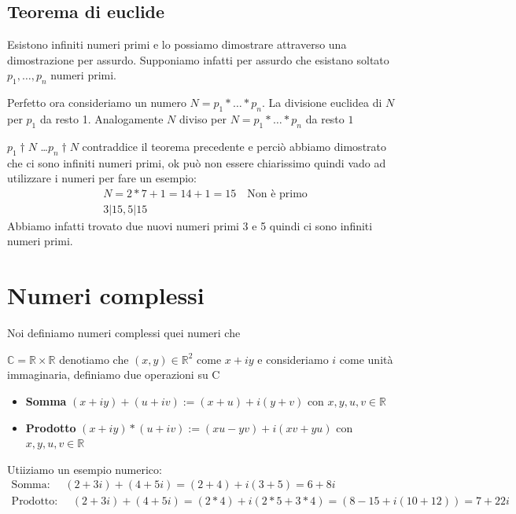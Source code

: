 \documentclass{article}
\theoremstyle{definition}
\begin{document}
\subsection{Teorema di euclide}
Esistono infiniti numeri primi e lo possiamo dimostrare attraverso una dimostrazione per assurdo.
Supponiamo infatti per assurdo che esistano soltato $p_1,\ldots,p_n$ numeri primi. \par
Perfetto ora consideriamo un numero $N = p_1* \ldots * p_n$.
La divisione euclidea di $N$ per $p_1$ da resto 1.
Analogamente $N$ diviso per $N = p_1* \ldots * p_n$ da resto $1$ \par

$p_1 \dag N$ \ldots  $p_n \dag N$ contraddice il teorema precedente e perciò abbiamo dimostrato che ci sono infiniti numeri primi, ok può non essere chiarissimo quindi vado ad utilizzare i numeri per fare un esempio:
\begin{align*}
        N = 2 * 7 + 1 = 14 + 1 = 15 \quad \textrm{Non è primo} \\
        3 | 15, 5 | 15
\end{align*}
Abbiamo infatti trovato due nuovi numeri primi 3 e 5 quindi ci sono infiniti numeri primi.





\newpage
\section{Numeri complessi}\label{sec:numeri_complessi}
Noi definiamo numeri complessi quei numeri che


$\mathbb{C} = \mathbb{R} \times \mathbb{R}$ denotiamo che $(x,y) \in \mathbb{R}^2$ come $x + iy$ e consideriamo $i$ come unità immaginaria, definiamo due operazioni su C
\begin{itemize}
        \item \textbf{Somma} $(x + iy) + (u + iv) := (x+u) + i(y+v)$ con $x,y,u,v \in \mathbb{R}$
        \item \textbf{Prodotto} $(x + iy) * (u + iv) := (xu - yv) + i(xv+yu)$ con $x,y,u,v \in \mathbb{R}$
\end{itemize}

Utiiziamo un esempio numerico:
\begin{align}
        \textrm{Somma: } \quad (2 + 3i) + (4 + 5i) = (2 + 4) + i(3 + 5) = 6 + 8i \\
        \textrm{Prodotto: } \quad (2 + 3i) + (4 + 5i) = (2 * 4) + i(2*5 + 3*4) = (8-15 + i(10+12)) = 7 + 22i
\end{align}
\end{document}
